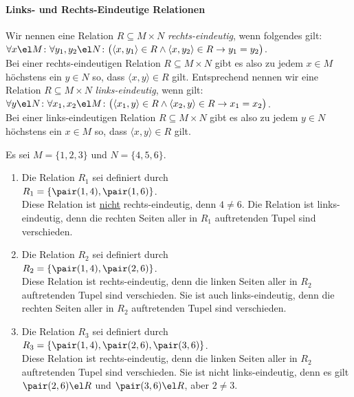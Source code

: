 \paragraph{Links- und Rechts-Eindeutige Relationen}
Wir nennen eine Relation $R \subseteq M \times N$ 
\emph{rechts-eindeutig}, wenn folgendes gilt: \\[0.2cm]
\hspace*{1.3cm} 
$\forall x \el M \colon \forall y_1, y_2 \el N \colon \bigl(\langle x, y_1 \rangle \in R \wedge \langle x, y_2 \rangle \in R \rightarrow y_1 = y_2\bigr)$.
\\[0.2cm]
Bei einer rechts-eindeutigen Relation $R \subseteq M \times N$ gibt es also zu jedem $x\in M$ h\"{o}chstens ein $y \in N$ so,
dass $\langle x, y \rangle \in R$ gilt.  Entsprechend nennen wir eine Relation $R \subseteq M \times N$ 
\emph{links-eindeutig}, wenn gilt: \\[0.2cm]
\hspace*{1.3cm} 
$\forall y \el N \colon \forall x_1, x_2 \el M \colon \bigl(\langle x_1, y \rangle \in R \wedge \langle x_2, y \rangle \in R \rightarrow x_1 = x_2\bigr)$.
\\[0.2cm]
Bei einer links-eindeutigen Relation $R \subseteq M \times N$ 
gibt es also zu jedem $y\in N$ h\"{o}chstens ein $x \in M$ so,
dass $\langle x, y \rangle \in R$ gilt.
\vspace{0.2cm}

\examples
Es sei $M = \{1,2,3\}$ und $N = \{4,5,6\}$.
\begin{enumerate}
\item Die Relation $R_1$ sei definiert durch \\[0.2cm]
      \hspace*{1.3cm} $R_1 = \{ \pair(1,4), \pair(1,6) \}$. \\[0.2cm]
      Diese Relation ist \underline{nicht} rechts-eindeutig, denn  $4 \not= 6$.
      Die Relation ist links-eindeutig, denn die rechten Seiten aller in $R_1$
      auftretenden Tupel sind verschieden.
\item Die Relation $R_2$ sei definiert durch \\[0.2cm]
      \hspace*{1.3cm} $R_2 = \{ \pair(1,4), \pair(2,6) \}$. \\[0.2cm]
      Diese Relation ist rechts-eindeutig, denn die linken Seiten aller in $R_2$ auftretenden
      Tupel sind verschieden.  Sie ist auch links-eindeutig, denn die rechten Seiten aller
      in $R_2$ auftretenden Tupel sind verschieden. 
\item Die Relation $R_3$ sei definiert durch \\[0.2cm]
      \hspace*{1.3cm} $R_3 = \{ \pair(1,4), \pair(2,6), \pair(3,6) \}$. \\[0.2cm]
      Diese Relation ist rechts-eindeutig, denn die linken Seiten aller in $R_2$       auftretenden
      Tupel sind verschieden.  Sie ist nicht links-eindeutig, denn es gilt
      $\pair(2,6) \el R$ und $\pair(3,6) \el R$, aber $2 \not= 3$.
      \eox
\end{enumerate}

